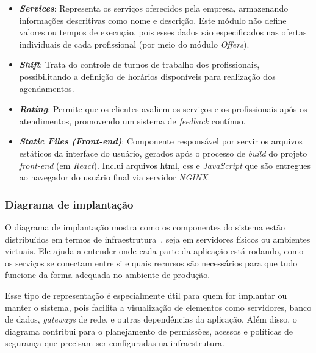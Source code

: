 \begin{itemize}
  \item \textbf{\emph{Services}}: Representa os serviços oferecidos pela empresa, armazenando informações descritivas como nome e descrição. Este módulo não define valores ou tempos de execução, pois esses dados são especificados nas ofertas individuais de cada profissional (por meio do módulo \textit{Offers}).

  \item \textbf{\emph{Shift}}: Trata do controle de turnos de trabalho dos profissionais, possibilitando a definição de horários disponíveis para realização dos agendamentos.

  \item \textbf{\emph{Rating}}: Permite que os clientes avaliem os serviços e os profissionais após os atendimentos, promovendo um sistema de \emph{feedback} contínuo.
  
  \item \textbf{\emph{Static Files (Front-end)}}: Componente responsável por servir os arquivos estáticos da interface do usuário, gerados após o processo de \textit{build} do projeto \emph{front-end} (em \emph{React}). Inclui arquivos \gls{html}, \gls{css} e \emph{JavaScript} que são entregues ao navegador do usuário final via servidor \emph{NGINX}.
\end{itemize}

\subsubsection{Diagrama de implantação}

O diagrama de implantação mostra como os componentes do sistema estão distribuídos em termos de infraestrutura~\cite{Booch2005}, seja em servidores físicos ou ambientes virtuais. Ele ajuda a entender onde cada parte da aplicação está rodando, como os serviços se conectam entre si e quais recursos são necessários para que tudo funcione da forma adequada no ambiente de produção.

Esse tipo de representação é especialmente útil para quem for implantar ou manter o sistema, pois facilita a visualização de elementos como servidores, banco de dados, \emph{gateways} de rede, e outras dependências da aplicação. Além disso, o diagrama contribui para o planejamento de permissões, acessos e políticas de segurança que precisam ser configuradas na infraestrutura.

